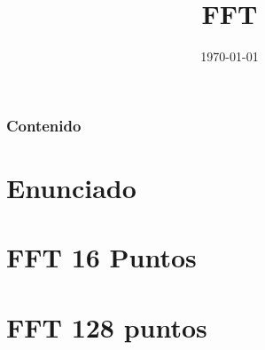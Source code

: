 \documentclass[t]{beamer}
\title[FFT]{FFT }
\date{\today}
\begin{document}
\begin{frame}
\maketitle
\end{frame}

\section[Outline]{}
\begin{frame}
       \frametitle{Contenido}	
        \vspace*{0.5cm}
       \tiny{\tableofcontents}
\end{frame}



\section{Enunciado}

\section{FFT 16 Puntos}

\section{}
\section{}

\section{}
\section{FFT 128 puntos}
\end{document}
